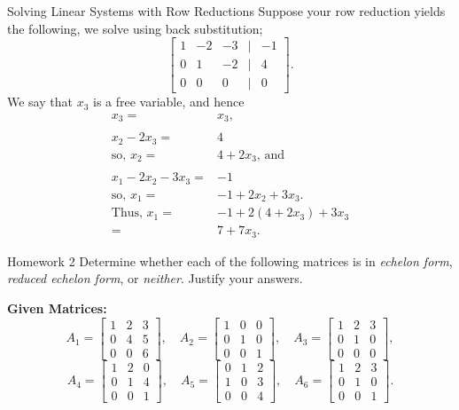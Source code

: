 \documentclass[10pt, aspectratio=169]{beamer}
\begin{document}
\begin{frame}{Solving Linear Systems with Row Reductions}
    Suppose your row reduction yields the following, we solve using back substitution;
    \[
    \begin{bmatrix}
            1 & -2 & -3 &| & -1\\
            0 &  1 & -2 &| &  4\\
            0 &  0 &  0 &| &  0
        \end{bmatrix}.
    \]
    We say that \(x_3\) is a free variable, and hence
    \begin{align*}
        x_3=&x_3,\\
            & \\
        x_2 - 2x_3 =& 4\\
        \text{so, } x_2 =& 4 + 2x_3 \text{, and }\\
            & \\
        x_1 - 2x_2 - 3x_3 =& -1\\
        \text{so, } x_1 =& -1 + 2x_2 + 3x_3.\\
        \text{Thus, }  x_1 =& -1 + 2(4 + 2x_3) + 3x_3\\
        =& 7 + 7x_3.
    \end{align*}

\end{frame}


\begin{frame}{Homework 2}
    Determine whether each of the following matrices is in \textit{echelon form}, \textit{reduced echelon form}, or \textit{neither}. Justify your answers.

\textbf{Given Matrices:}
\[
A_1 = \begin{bmatrix} 
1 & 2 & 3 \\
0 & 4 & 5 \\
0 & 0 & 6 
\end{bmatrix}, \quad
A_2 = \begin{bmatrix} 
1 & 0 & 0 \\
0 & 1 & 0 \\
0 & 0 & 1 
\end{bmatrix}, \quad
A_3 = \begin{bmatrix} 
1 & 2 & 3 \\
0 & 1 & 0 \\
0 & 0 & 0 
\end{bmatrix},
\]
\[
A_4 = \begin{bmatrix} 
1 & 2 & 0 \\
0 & 1 & 4 \\
0 & 0 & 1 
\end{bmatrix}, \quad
A_5 = \begin{bmatrix} 
0 & 1 & 2 \\
1 & 0 & 3 \\
0 & 0 & 4 
\end{bmatrix}, \quad
A_6 = \begin{bmatrix} 
1 & 2 & 3 \\
0 & 1 & 0 \\
0 & 0 & 1 
\end{bmatrix}.
\]
\end{frame}
\end{document}
